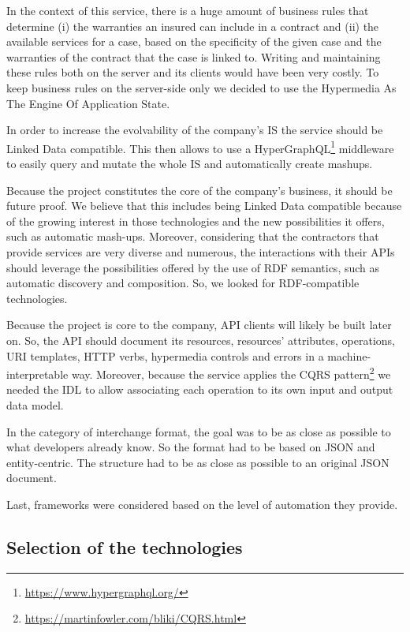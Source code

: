 In the context of this service, there is a huge amount of business rules that determine (i) the warranties an insured can include in a contract and (ii) the available services for a case, based on the specificity of the given case and the warranties of the contract that the case is linked to. Writing and maintaining these rules both on the server and its clients would have been very costly. To keep business rules on the server-side only we decided to use the Hypermedia As The Engine Of Application State.

In order to increase the evolvability of the company's IS the service should be Linked Data compatible. This then allows to use a HyperGraphQL\footnote{\url{https://www.hypergraphql.org/}} middleware to easily query and mutate the whole IS and automatically create mashups.

Because the project constitutes the core of the company's business, it should be future proof. We believe that this includes being Linked Data compatible because of the growing interest in those technologies and the new possibilities it offers, such as automatic mash-ups. Moreover, considering that the contractors that provide services are very diverse and numerous, the interactions with their APIs should leverage the possibilities offered by the use of RDF semantics, such as automatic discovery and composition. So, we looked for RDF-compatible technologies.

Because the project is core to the company, API clients will likely be built later on. So, the API should document its resources, resources' attributes, operations, URI templates, HTTP verbs, hypermedia controls and errors in a machine-interpretable way. Moreover, because the service applies the CQRS pattern\footnote{\url{https://martinfowler.com/bliki/CQRS.html}} we needed the IDL to allow associating each operation to its own input and output data model.

In the category of interchange format, the goal was to be as close as possible to what developers already know. So the format had to be based on JSON and entity-centric. The structure had to be as close as possible to an original JSON document.

Last, frameworks were considered based on the level of automation they provide.

\subsection{Selection of the technologies}

